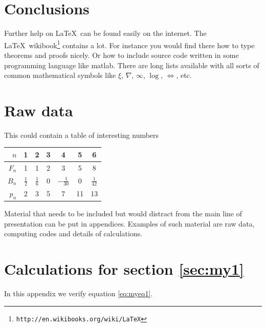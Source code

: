 \documentclass{uonmathreport}
\theoremstyle{definition}
\theoremstyle{problem}
\theoremstyle{theorem}
\begin{document}
\newpage

\section{Conclusions} \label{sec:conclusions}

Further help on \LaTeX\ can be found easily on the internet. The \LaTeX\
wikibook\footnote{\tt http://en.wikibooks.org/wiki/LaTeX} contains a lot.
For instance you would find there how to type theorems and proofs nicely.
Or how to include source code written in some programming language like
matlab. There are long lists available with all sorts of common
mathematical symbols like $\xi$, $\nabla$, $\infty$, $\log$, $\iff$, etc.

\newpage

\appendix

\section{Raw data} \label{app:rawdata}

This could contain a table of interesting numbers
\begin{center}
  \begin{tabular}{r|cccccc}
    $n$   & 1 & 2 & 3 & 4 & 5 & 6 \\ \hline
    $F_n$ & 1 & 1 & 2 & 3 & 5 & 8 \\
    $B_n$ & $\tfrac{1}{2}$ & $\tfrac{1}{6}$ & 0 & $-\tfrac{1}{30}$ & 0 &  $\tfrac{1}{42}$ \\
    $p_n$ & 2 & 3& 5& 7 & 11 & 13 \\
  \end{tabular}
\end{center}

Material that needs to be included but would distract from the main
line of presentation can be put in appendices.
Examples of such material are raw
data, computing codes and details of calculations.


\section{Calculations for section \ref{sec:my1}} \label{app:calculations}

In this appendix we verify equation \eqref{eq:myeq1}.

\newpage

	
	
\end{document}
